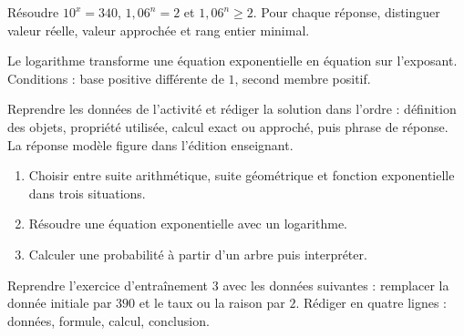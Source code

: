\begin{activite}
Résoudre $10^x=340$, $1{,}06^n=2$ et $1{,}06^n\geq2$. Pour chaque réponse, distinguer valeur réelle, valeur approchée et rang entier minimal.

\end{activite}

\begin{traceecrite}Le logarithme transforme une équation exponentielle en équation sur l'exposant. Conditions : base positive différente de $1$, second membre positif.\end{traceecrite}

\begin{exemple}
Reprendre les données de l'activité et rédiger la solution dans l'ordre : définition des objets, propriété utilisée, calcul exact ou approché, puis phrase de réponse. La réponse modèle figure dans l'édition enseignant.
\end{exemple}

\begin{exercice}[-- essentiel]
\begin{enumerate}\item Choisir entre suite arithmétique, suite géométrique et fonction exponentielle dans trois situations.\item Résoudre une équation exponentielle avec un logarithme.\item Calculer une probabilité à partir d'un arbre puis interpréter.\end{enumerate}
\end{exercice}


\begin{dm}Reprendre l'exercice d'entraînement 3 avec les données suivantes : remplacer la donnée initiale par $390$ et le taux ou la raison par $2$. Rédiger en quatre lignes : données, formule, calcul, conclusion.\end{dm}


